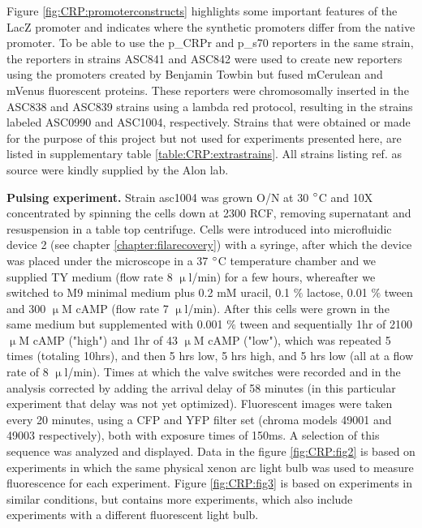 %
Figure \ref{fig:CRP:promoterconstructs} highlights some important features of the LacZ promoter and indicates where the synthetic promoters differ from the native promoter.
%
To be able to use the p\_CRPr and p\_s70 reporters in the same strain, the reporters in strains ASC841 and ASC842 were used to create new reporters using the promoters created by Benjamin Towbin but fused mCerulean and mVenus fluorescent proteins.
These reporters were chromosomally inserted in the ASC838 and ASC839 strains using a lambda red protocol, resulting in the strains labeled ASC0990 and ASC1004, respectively.
%
Strains that were obtained or made for the purpose of this project but not used for experiments presented here, are listed in supplementary table \ref{table:CRP:extrastrains}. All strains listing ref. \cite{Towbin2017} as source were kindly supplied by the Alon lab.

\textbf{Pulsing experiment.} Strain asc1004 was grown O/N at 30 $\degree$C and 10X concentrated by spinning the cells down at 2300 RCF, removing supernatant and resuspension in a table top centrifuge.
Cells were introduced into microfluidic device 2 (see chapter \ref{chapter:filarecovery}) with a syringe, after which the device was placed under the microscope in a 37 $\degree$C temperature chamber and we supplied TY medium (flow rate 8 $\upmu$l/min) for a few hours, whereafter we switched to M9 minimal medium plus 0.2 mM uracil, 0.1 $\%$ lactose, 0.01 $\%$ tween and 300 $\upmu$M cAMP (flow rate 7 $\upmu$l/min).
After this cells were grown in the same medium but supplemented with 0.001 $\%$ tween and sequentially 1hr of 2100 $\upmu$M cAMP ("high") and 1hr of 43 $\upmu$M cAMP ("low"), which was repeated 5 times (totaling 10hrs), and then 5 hrs low, 5 hrs high, and 5 hrs low (all at a flow rate of 8 $\upmu$l/min). 
Times at which the valve switches were recorded and in the analysis corrected by adding the arrival delay of 58 minutes (in this particular experiment that delay was not yet optimized).
Fluorescent images were taken every 20 minutes, using a CFP and YFP filter set (chroma models 49001 and 49003 respectively), both with exposure times of 150ms.
A selection of this sequence was analyzed and displayed.  
Data in the figure \ref{fig:CRP:fig2} is based on experiments in which the same physical xenon arc light bulb was used to measure fluorescence for each experiment.
Figure \ref{fig:CRP:fig3} is based on experiments in similar conditions, but contains more experiments, which also include experiments with a different fluorescent light bulb.

